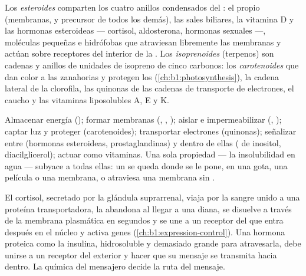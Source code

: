 \begin{definition}\label{def:b1:lipids:steroids}
Los \emph{esteroides} comparten los cuatro anillos
condensados del : el propio  (membranas, y precursor de
todos los demás), las sales biliares, la vitamina D y las hormonas
esteroideas --- cortisol, aldosterona, hormonas sexuales ---, moléculas
pequeñas e hidrófobas que atraviesan libremente las membranas y actúan sobre
receptores del interior de la . Los
\emph{isoprenoides} (terpenos) son cadenas y anillos de
unidades de isopreno de cinco carbonos: los \emph{carotenoides} que dan
color a las zanahorias y protegen los 
(\cref{ch:b1:photosynthesis}), la cadena lateral de la clorofila, las
quinonas de las cadenas de transporte de electrones, el caucho y las
vitaminas liposolubles A, E y K.
\end{definition}

\begin{proposition}\label{prop:b1:lipids:functions}
Almacenar energía (); formar membranas (,
, ); aislar e impermeabilizar (, ); captar
luz y proteger (carotenoides); transportar electrones (quinonas); señalizar
entre  (hormonas esteroideas, prostaglandinas) y dentro de ellas
( de inositol, diacilglicerol); actuar como vitaminas. Una sola
propiedad --- la insolubilidad en agua --- subyace a todas ellas: un 
se queda donde se le pone, en una gota, una película o una membrana, o
atraviesa una membrana sin .
\end{proposition}

\begin{example}\label{ex:b1:lipids:steroidhormone}
El cortisol, secretado por la glándula suprarrenal, viaja por la sangre
unido a una proteína transportadora, la abandona al llegar a una 
diana, se disuelve a través de la membrana plasmática en segundos y se une a
un receptor del  que entra después en el núcleo y activa genes
(\cref{ch:b1:expression-control}). Una hormona proteica como la insulina,
hidrosoluble y demasiado grande para atravesarla, debe unirse a un receptor
del exterior y hacer que su mensaje se transmita hacia dentro. La química
del mensajero decide la ruta del mensaje.
\end{example}

